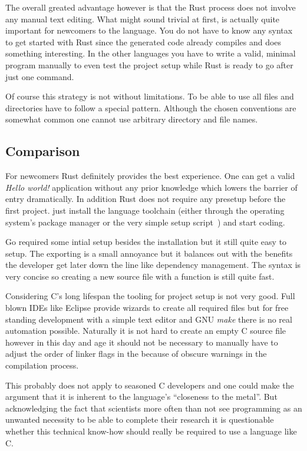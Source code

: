 The overall greated advantage however is that the Rust process does not involve any manual text editing. What might sound trivial at first, is actually quite important for newcomers to the language. You do not have to know any syntax to get started with Rust since the generated code already compiles and does something interesting. In the other languages you have to write a valid, minimal program manually to even test the project setup while Rust is ready to go after just one command.

Of course this strategy is not without limitations. To be able to use  all files and directories have to follow a special pattern. Although the chosen conventions are somewhat common one cannot use arbitrary directory and file names.


\subsection{Comparison}
\label{subsec:Implementation::Setup::Comparison}

For newcomers Rust definitely provides the best experience. One can get a valid \textit{Hello world!} application without any prior knowledge which lowers the barrier of entry dramatically. In addition Rust does not require any presetup before the first project. just install the language toolchain (either through the operating system's package manager or the very simple setup script~) and start coding.

Go required some intial setup besides the installation but it still quite easy to setup. The  exporting is a small annoyance but it balances out with the benefits the developer get later down the line like dependency management. The syntax is very concise so creating a new source file with a  function is still quite fast.

Considering C's long lifespan the tooling for project setup is not very good. Full blown IDEs like Eclipse provide wizards to create all required files but for free standing development with a simple text editor and GNU \textit{make} there is no real automation possible. Naturally it is not hard to create an empty C source file however in this day and age it should not be necessary to manually have to adjust the order of linker flags in the  because of obscure warnings in the compilation process.

This probably does not apply to seasoned C developers and one could make the argument that it is inherent to the language's ``closeness to the metal''. But acknowledging the fact that scientists more often than not see programming as an unwanted necessity to be able to complete their research it is questionable whether this technical know-how should really be required to use a language like C.

